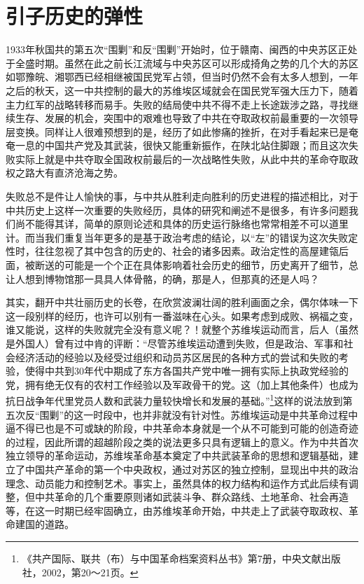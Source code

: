 \chapter*{引子\quad 历史的弹性}

1933年秋国共的第五次“围剿”和反“围剿”开始时，位于赣南、闽西的中央苏区正处于全盛时期。虽然在此之前长江流域与中央苏区可以形成掎角之势的几个大的苏区如鄂豫皖、湘鄂西已经相继被国民党军占领，但当时仍然不会有太多人想到，一年之后的秋天，这一中共控制的最大的苏维埃区域就会在国民党军强大压力下，随着主力红军的战略转移而易手。失败的结局使中共不得不走上长途跋涉之路，寻找继续生存、发展的机会，突围中的艰难也导致了中共在夺取政权前最重要的一次领导层变换。同样让人很难预想到的是，经历了如此惨痛的挫折，在对手看起来已是奄奄一息的中国共产党及其武装，很快又能重新振作，在陕北站住脚跟；而且这次失败实际上就是中共夺取全国政权前最后的一次战略性失败，从此中共的革命夺取政权之路大有直济沧海之势。

失败总不是件让人愉快的事，与中共从胜利走向胜利的历史进程的描述相比，对于中共历史上这样一次重要的失败经历，具体的研究和阐述不是很多，有许多问题我们尚不能得其详，简单的原则论述和具体的历史运行脉络也常常相差不可以道里计。而当我们重复当年更多的是基于政治考虑的结论，以“左”的错误为这次失败定性时，往往忽视了其中包含的历史的、社会的诸多因素。政治定性的高屋建瓴后面，被断送的可能是一个个正在具体影响着社会历史的细节，历史离开了细节，总让人想到博物馆那一具具人体骨骼，的确，那是人，但那真的还是人吗？

其实，翻开中共壮丽历史的长卷，在欣赏波澜壮阔的胜利画面之余，偶尔体味一下这一段别样的经历，也许可以别有一番滋味在心头。如果考虑到成败、祸福之变，谁又能说，这样的失败就完全没有意义呢？！就整个苏维埃运动而言，后人（虽然是外国人）曾有过中肯的评断：“尽管苏维埃运动遭到失败，但是政治、军事和社会经济活动的经验以及经受过组织和动员苏区居民的各种方式的尝试和失败的考验，使得中共到30年代中期成了东方各国共产党中唯一拥有实际上执政党经验的党，拥有绝无仅有的农村工作经验以及军政骨干的党。这（加上其他条件）也成为抗日战争年代里党员人数和武装力量较快增长和发展的基础。”\footnote{《共产国际、联共（布）与中国革命档案资料丛书》第7册，中央文献出版社，2002，第20～21页。}这样的说法放到第五次反“围剿”的这一时段中，也并非就没有针对性。苏维埃运动是中共革命过程中逼不得已也是不可或缺的阶段，中共革命本身就是一个从不可能到可能的创造奇迹的过程，因此所谓的超越阶段之类的说法更多只具有逻辑上的意义。作为中共首次独立领导的革命运动，苏维埃革命基本奠定了中共武装革命的思想和逻辑基础，建立了中国共产革命的第一个中央政权，通过对苏区的独立控制，显现出中共的政治理念、动员能力和控制艺术。事实上，虽然具体的权力结构和运作方式此后续有调整，但中共革命的几个重要原则诸如武装斗争、群众路线、土地革命、社会再造等，在这一时期已经牢固确立，由苏维埃革命开始，中共走上了武装夺取政权、革命建国的道路。

